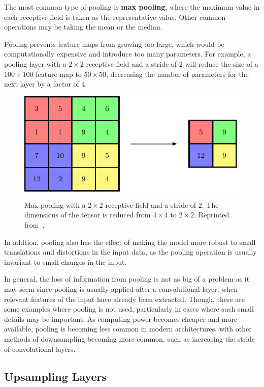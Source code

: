 \documentclass[12pt]{report}
\theoremstyle{definition}
\theoremstyle{remark}
\begin{document}
The most common type of pooling is \textbf{max pooling}, where the maximum value in each receptive field is taken as the representative value. Other common operations may be taking the mean or the median.

Pooling prevents feature maps from growing too large, which would be computationally expensive and introduce too many parameters. For example, a pooling layer with a $2 \times 2$ receptive field and a stride of $2$ will reduce the size of a $100 \times 100$ feature map to $50 \times 50$, decreasing the number of parameters for the next layer by a factor of $4$.

\begin{figure}[h]
    \centering
    \includegraphics[width=0.7\linewidth]{figs/max_pooling.pdf}
    \caption{Max pooling with a $2 \times 2$ receptive field and a stride of $2$. The dimensions of the tensor is reduced from $4 \times 4$ to $2 \times 2$. Reprinted from~\cite{bishop_deep_2023}.}
    \label{fig:max-pooling}
\end{figure}

In addtion, pooling also has the effect of making the model more robust to small translations and distortions in the input data, as the pooling operation is usually invariant to small changes in the input.

In general, the loss of information from pooling is not as big of a problem as it may seem since pooling is usually applied after a convolutional layer, when relevant features of the input have already been extracted. Though, there are some examples where pooling is not used, particularly in cases where such small details may be important. As computing power becomes cheaper and more available, pooling is becoming less common in modern architectures, with other methods of downsampling becoming more common, such as increasing the stride of convolutional layers.

\subsection{Upsampling Layers}
\end{document}
